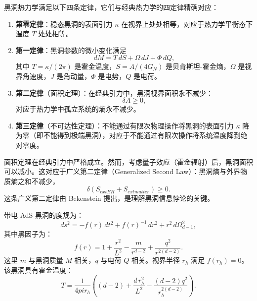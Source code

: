 \begin{theorem}[黑洞热力学四定律]\label{thm:four-laws}
黑洞热力学满足以下四条定律，它们与经典热力学的四定律精确对应：
\begin{enumerate}
    \item \textbf{第零定律}：稳态黑洞的表面引力 $\kappa$ 在视界上处处相等，对应于热力学平衡态下温度 $T$ 处处相等。
    \item \textbf{第一定律}：黑洞参数的微小变化满足
    \begin{equation}\label{eq:first-law}
        dM = T\,dS + \Omega\,dJ + \Phi\,dQ,
    \end{equation}
    其中 $T = \kappa/(2\pi)$ 是霍金温度，$S = A/(4G_N)$ 是贝肯斯坦-霍金熵，$\Omega$ 是视界角速度，$J$ 是角动量，$\Phi$ 是电势，$Q$ 是电荷。
    \item \textbf{第二定律}（面积定理）：在经典引力中，黑洞视界面积永不减少：
    \begin{equation}
        \delta A \geq 0,
    \end{equation}
    对应于热力学中孤立系统的熵永不减少。
    \item \textbf{第三定律}（不可达性定理）：不能通过有限次物理操作将黑洞的表面引力 $\kappa$ 降为零（即不能得到极端黑洞），对应于不能通过有限次操作将系统温度降到绝对零度。
\end{enumerate}
\end{theorem}

\begin{remark}[面积定理与霍金辐射的修正]
面积定理在经典引力中严格成立。然而，考虑量子效应（霍金辐射）后，黑洞面积可以减小。这对应于广义第二定律（Generalized Second Law）：黑洞熵与外界物质熵之和不减少，
\begin{equation}
    \delta(S_{ext{BH}} + S_{ext{matter}}) \geq 0.
\end{equation}
这条广义第二定律由 Bekenstein 提出，是理解黑洞信息悖论的关键。
\end{remark}

\begin{definition}\label{def:RN-AdS}
带电 AdS 黑洞的度规为：
\begin{equation}
    ds^2 = -f(r)\,dt^2 + f(r)^{-1}\,dr^2 + r^2\,d\Omega_{d-1}^2,
\end{equation}
其中黑因子为：
\begin{equation}
    f(r) = 1 + \frac{r^2}{L^2} - \frac{m}{r^{d-2}} + \frac{q^2}{r^{2(d-2)}}.
\end{equation}
这里 $m$ 与黑洞质量 $M$ 相关，$q$ 与电荷 $Q$ 相关。视界半径 $r_h$ 满足 $f(r_h) = 0$。该黑洞具有霍金温度：
\begin{equation}
    T = \frac{1}{4pi r_h}\left((d-2) + \frac{d\,r_h^2}{L^2} - \frac{(d-2)q^2}{r_h^{2(d-2)}}\right).
\end{equation}
\end{definition}

